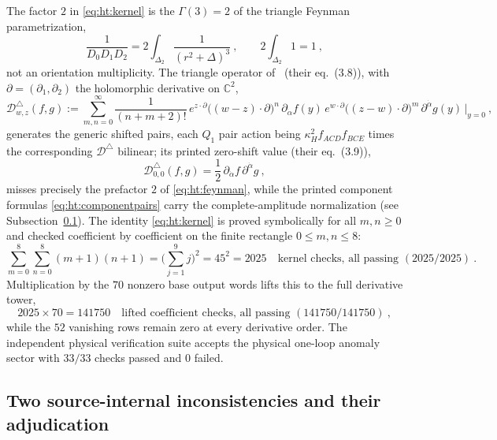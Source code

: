 The factor $2$ in \eqref{eq:ht:kernel} is the $\Gamma(3)=2$ of the triangle
Feynman parametrization,
\begin{equation}\label{eq:ht:feynman}
\frac{1}{D_{0}D_{1}D_{2}}
=2\int_{\Delta_{2}}\frac{1}{(r^{2}+\Delta)^{3}} \ ,
\qquad 2\int_{\Delta_{2}}1=1 \ ,
\end{equation}
not an orientation multiplicity. The triangle operator of~\cite{BK} (their
eq.~(3.8)), with $\partial=(\partial_{1},\partial_{2})$ the holomorphic
derivative on $\mathbb C^{2}$,
\begin{equation}\label{eq:ht:dtri}
\mathcal D^{\triangle}_{w,z}(f,g)
:=\sum_{m,n=0}^{\infty}\frac{1}{(n+m+2)!}\,
e^{z\cdot\partial}\big((w-z)\cdot\partial\big)^{n}\,
\partial_{\dot\alpha}f(y)\,
e^{w\cdot\partial}\big((z-w)\cdot\partial\big)^{m}\,
\partial^{\dot\alpha}g(y)\,\Big|_{y=0} \ ,
\end{equation}
generates the generic shifted pairs, each $Q_{1}$ pair action being
$\kappa_{H}^{2}f_{ACD}f_{BCE}$ times the corresponding
$\mathcal D^{\triangle}$ bilinear; its printed zero-shift value (their
eq.~(3.9)),
\begin{equation}\label{eq:ht:dtri00}
\mathcal D^{\triangle}_{0,0}(f,g)
=\frac12\,\partial_{\dot\alpha}f\,\partial^{\dot\alpha}g \ ,
\end{equation}
misses precisely the prefactor $2$ of \eqref{eq:ht:feynman}, while the
printed component formulas \eqref{eq:ht:componentpairs} carry the
complete-amplitude normalization (see
Subsection~\ref{subsec:ht:conflicts}). The identity \eqref{eq:ht:kernel} is
proved symbolically for all $m,n\ge0$ and checked coefficient by coefficient
on the finite rectangle $0\le m,n\le8$:
\begin{equation}\label{eq:ht:2025}
\sum_{m=0}^{8}\sum_{n=0}^{8}(m+1)(n+1)
=\Big(\sum_{j=1}^{9}j\Big)^{2}=45^{2}=2025
\quad\text{kernel checks, all passing }(2025/2025)\ .
\end{equation}
Multiplication by the $70$ nonzero base output words lifts this to the full
derivative tower,
\begin{equation}\label{eq:ht:141750}
2025\times70=141750
\quad\text{lifted coefficient checks, all passing }(141750/141750)\ ,
\end{equation}
while the $52$ vanishing rows remain zero at every derivative order. The
independent physical verification suite accepts the physical one-loop anomaly
sector with $33/33$ checks passed and $0$ failed.

\subsection{Two source-internal inconsistencies and their adjudication}\label{subsec:ht:conflicts}

